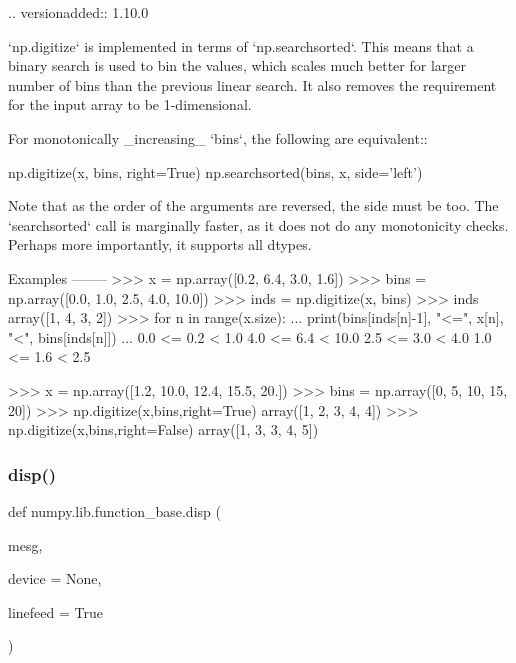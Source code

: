 \begin{DoxyVerb}
.. versionadded:: 1.10.0

`np.digitize` is  implemented in terms of `np.searchsorted`. This means
that a binary search is used to bin the values, which scales much better
for larger number of bins than the previous linear search. It also removes
the requirement for the input array to be 1-dimensional.

For monotonically _increasing_ `bins`, the following are equivalent::

    np.digitize(x, bins, right=True)
    np.searchsorted(bins, x, side='left')

Note that as the order of the arguments are reversed, the side must be too.
The `searchsorted` call is marginally faster, as it does not do any
monotonicity checks. Perhaps more importantly, it supports all dtypes.

Examples
--------
>>> x = np.array([0.2, 6.4, 3.0, 1.6])
>>> bins = np.array([0.0, 1.0, 2.5, 4.0, 10.0])
>>> inds = np.digitize(x, bins)
>>> inds
array([1, 4, 3, 2])
>>> for n in range(x.size):
...   print(bins[inds[n]-1], "<=", x[n], "<", bins[inds[n]])
...
0.0 <= 0.2 < 1.0
4.0 <= 6.4 < 10.0
2.5 <= 3.0 < 4.0
1.0 <= 1.6 < 2.5

>>> x = np.array([1.2, 10.0, 12.4, 15.5, 20.])
>>> bins = np.array([0, 5, 10, 15, 20])
>>> np.digitize(x,bins,right=True)
array([1, 2, 3, 4, 4])
>>> np.digitize(x,bins,right=False)
array([1, 3, 3, 4, 5])
\end{DoxyVerb}
 \mbox{\label{namespacenumpy_1_1lib_1_1function__base_af46ece4284639d18b2dbef20d55b7da9}} 
\subsubsection{\texorpdfstring{disp()}{disp()}}
{\footnotesize\ttfamily def numpy.\+lib.\+function\+\_\+base.\+disp (\begin{DoxyParamCaption}\item[{}]{mesg,  }\item[{}]{device = {\ttfamily None},  }\item[{}]{linefeed = {\ttfamily True} }\end{DoxyParamCaption})}

